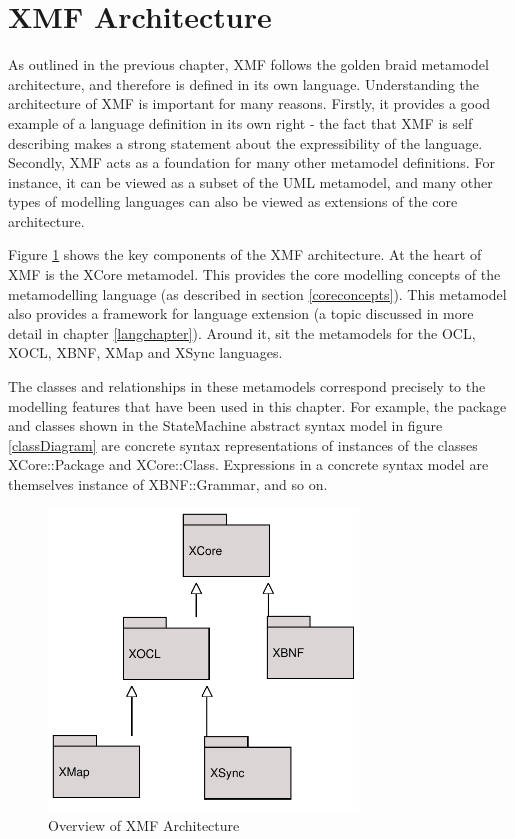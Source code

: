 \section{XMF Architecture}

As outlined in the previous chapter, XMF follows the golden braid
metamodel architecture, and therefore is defined in its own
language. Understanding the architecture of XMF is important for
many reasons. Firstly, it provides a good example of a language
definition in its own right - the fact that XMF is self describing
makes a strong statement about the expressibility of the language.
Secondly, XMF acts as a foundation for many other metamodel
definitions. For instance, it can be viewed as a subset of the UML
metamodel, and many other types of modelling languages can also be
viewed as extensions of the core architecture.

Figure \ref{XMFOverview} shows the key components of the XMF
architecture. At the heart of XMF is the XCore metamodel. This
provides the core modelling concepts of the metamodelling language
(as described in section \ref{coreconcepts}). This metamodel also
provides a framework for language extension (a topic discussed in
more detail in chapter \ref{langchapter}). Around it, sit the
metamodels for the OCL, XOCL, XBNF, XMap and XSync languages.

The classes and relationships in these metamodels correspond
precisely to the modelling features that have been used in this
chapter. For example, the package and classes shown in the
StateMachine abstract syntax model in figure \ref{classDiagram}
are concrete syntax representations of instances of the classes
XCore::Package and XCore::Class. Expressions in a concrete syntax
model are themselves instance of XBNF::Grammar, and so on.

\begin{figure}[htb]
\begin{center}
\includegraphics[height=8cm]{XMF/figures/arch.pdf}
\caption{Overview of XMF Architecture} \label{XMFOverview}
\end{center}
\end{figure}

